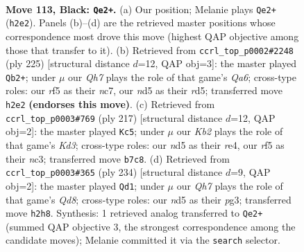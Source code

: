 \documentclass[11pt]{article}
\begin{document}
\clearpage

\begin{figure}[p]\centering
\begin{subfigure}{0.46\textwidth}\centering
\resizebox{\linewidth}{!}{%
\newchessgame
\chessboard[
  setfen={3B4/1k6/8/1K1N1R2/8/8/7q/8 b - - 3 113},
  showmover=false,
  pgfstyle=straightmove, color=movearrow, markmove={h2-e2}
]}
\caption{}
\end{subfigure}\hfill
\begin{subfigure}{0.46\textwidth}\centering
\resizebox{\linewidth}{!}{%
\newchessgame
\chessboard[
  setfen={8/1KN5/5k2/3R4/8/q2B4/8/8 b - - 24 113},
  showmover=false,
  pgfstyle=straightmove, color=movearrow, markmove={a3-b2}
]}
\caption{}
\end{subfigure}
\\[4pt]
\begin{subfigure}{0.46\textwidth}\centering
\resizebox{\linewidth}{!}{%
\newchessgame
\chessboard[
  setfen={8/8/3k4/8/2B1R3/2N5/2K5/q7 b - - 18 109},
  showmover=false,
  pgfstyle=straightmove, color=movearrow, markmove={d6-c5}
]}
\caption{}
\end{subfigure}\hfill
\begin{subfigure}{0.46\textwidth}\centering
\resizebox{\linewidth}{!}{%
\newchessgame
\chessboard[
  setfen={3Q4/6K1/8/7k/8/5rp1/8/8 w - - 0 118},
  showmover=false,
  pgfstyle=straightmove, color=movearrow, markmove={d8-d1}
]}
\caption{}
\end{subfigure}
\caption{\textbf{Move 113, Black: \texttt{Qe2+}.} (a) Our position; Melanie plays \texttt{Qe2+} (\texttt{h2e2}). Panels (b)--(d) are the retrieved master positions whose correspondence most drove this move (highest QAP objective among those that transfer to it). (b) Retrieved from \texttt{ccrl\_top\_p0002\#2248} (ply 225) [structural distance $d$=12, QAP obj=3]: the master played \texttt{Qb2+}; under $\mu$ our \emph{Qh7} plays the role of that game's \emph{Qa6}; cross-type roles: our \emph{r}f5 as their \emph{n}c7, our \emph{n}d5 as their \emph{r}d5; transferred move \texttt{h2e2} \textbf{(endorses this move)}. (c) Retrieved from \texttt{ccrl\_top\_p0003\#769} (ply 217) [structural distance $d$=12, QAP obj=2]: the master played \texttt{Kc5}; under $\mu$ our \emph{Kb2} plays the role of that game's \emph{Kd3}; cross-type roles: our \emph{n}d5 as their \emph{r}e4, our \emph{r}f5 as their \emph{n}c3; transferred move \texttt{b7c8}. (d) Retrieved from \texttt{ccrl\_top\_p0003\#365} (ply 234) [structural distance $d$=9, QAP obj=2]: the master played \texttt{Qd1}; under $\mu$ our \emph{Qh7} plays the role of that game's \emph{Qd8}; cross-type roles: our \emph{n}d5 as their \emph{p}g3; transferred move \texttt{h2h8}. Synthesis: 1 retrieved analog transferred to \texttt{Qe2+} (summed QAP objective 3, the strongest correspondence among the candidate moves); Melanie committed it via the \texttt{search} selector.}
\label{fig:thought-m225}
\end{figure}
\end{document}
